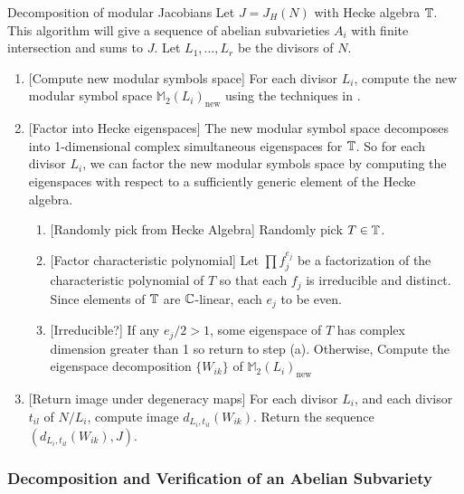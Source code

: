 \documentclass{article}
\begin{document}
\begin{algorithm}{Decomposition of modular Jacobians}
    \label{alg:decomp_jacobian}
    Let $J=J_H(N)$ with Hecke algebra $\mathbb{T}$. This algorithm will give a sequence
    of abelian subvarieties $A_i$ with finite intersection and sums to $J$. Let
    $L_1,\ldots, L_r$ be the divisors of $N$.
    \begin{enumerate}
        \item{} [Compute new modular symbols space]
            For each divisor $L_i$, compute the new modular symbol space
            $\mathbb{M}_2(L_i)_\mathrm{new}$ using the techniques in \cite[\S
            8]{stein:modform}.
        \item{} [Factor into Hecke eigenspaces]
            The new modular symbol space decomposes into 1-dimensional complex
            simultaneous eigenspaces for $\mathbb{T}$. So for each divisor $L_i$, we can
            factor the new modular symbols space by computing the eigenspaces
            with respect to a sufficiently generic element of the Hecke algebra.
            \begin{enumerate}
                \item{} [Randomly pick from Hecke Algebra]
                    Randomly pick $T\in \mathbb{T}$.
                \item{} [Factor characteristic polynomial]
                    Let $\prod f_j ^{e_j}$ be a factorization of the characteristic
                    polynomial of $T$ so that each $f_j$ is irreducible and
                    distinct. Since elements of $\mathbb{T}$ are $\mathbb{C}$-linear, each
                    $e_j$ to be even.
                \item{} [Irreducible?]
                    If any $e_j/2 > 1$, some eigenspace of $T$ has complex
                    dimension greater than 1 so return to step (a). Otherwise,
                    Compute the eigenspace decomposition $\{W_{ik}\}$ of
                    $\mathbb{M}_2(L_i)_\mathrm{new}$
            \end{enumerate}
        \item{} [Return image under degeneracy maps]
            For each divisor $L_i$, and each divisor $t_{il}$ of $N/L_i$,
            compute image $d_{L_i, t_{il}}(W_{ik})$. Return the sequence
            $(d_{L_i, t_{il}}(W_{ik}), J)$. 
    \end{enumerate}
\end{algorithm}

\subsubsection{Decomposition and Verification of an Abelian Subvariety} 
\label{sec:decomp_verify}
\end{document}
